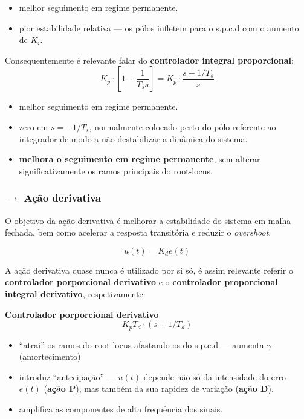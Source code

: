 \begin{itemize}
    \item melhor seguimento em regime permanente.
    \item pior estabilidade relativa --- os pólos infletem para o s.p.c.d com o aumento de $K_i$.
\end{itemize}

\noindent Consequentemente é relevante falar do \textbf{controlador integral proporcional}:
$$
    K_p \cdot \left[1 + \dfrac{1}{T_s s}\right] = K_p \cdot \dfrac{s + 1/T_s}{s}
$$

\begin{itemize}
    \item melhor seguimento em regime permanente.
    \item zero em $s = -1/T_s$, normalmente colocado perto do pólo referente ao integrador de modo a não destabilizar a dinâmica do sistema.
    \item \textbf{melhora o seguimento em regime permanente}, sem alterar significativamente os ramos principais do root-locus.
\end{itemize}
\newpage
\subsubsection[3.4.3 Ação derivativa]{$\pmb{\rightarrow}$ Ação derivativa}
\noindent O objetivo da ação derivativa é melhorar a estabilidade do sistema em malha fechada, bem como acelerar a resposta transitória e reduzir o \textit{overshoot}.

$$
    u(t) = K_d \Dot{e}(t)
$$

\noindent A ação derivativa quase nunca é utilizado por si só, é assim relevante referir o \textbf{controlador porporcional derivativo} e o \textbf{controlador proporcional integral derivativo}, respetivamente:

\vspace{1em}
\noindent \textbf{Controlador porporcional derivativo}
$$
    K_pT_d\cdot(s + 1/T_d)
$$
\begin{itemize}
    \item “atrai” os ramos do root-locus afastando-os do s.p.c.d --- aumenta $\gamma$ (amortecimento)
    \item introduz “antecipação” --- $u(t)$ depende não só da intensidade do erro $e(t)$ (\textbf{ação P}), mas também da sua rapidez de variação (\textbf{ação D}).
    \item amplifica as componentes de alta frequência dos sinais.
\end{itemize}

